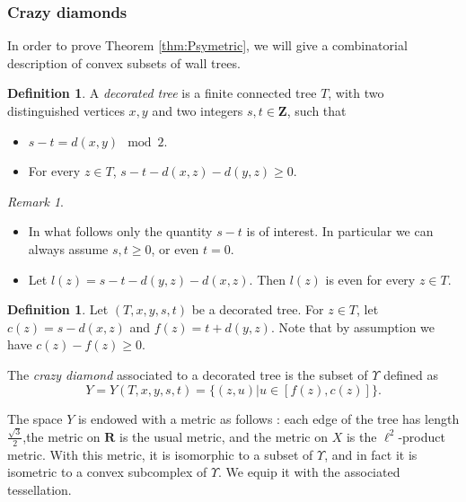 \documentclass[a4paper, 11pt]{article}
\theoremstyle{plain}
\theoremstyle{definition}
\newtheorem{definition}[proposition]{Definition}
\theoremstyle{remark}
\newtheorem{remark}[proposition]{Remark}
\newcommand{\RR}{\mathbf{R}}                          %
\newcommand{\ZZ}{\mathbf{Z}}                          %
\begin{document}
\subsubsection{Crazy diamonds}\label{sec:crazydiamonds}

In order to prove Theorem \ref{thm:Psymetric}, we will give a combinatorial description of convex subsets of wall trees.

\begin{definition}%
A \emph{decorated tree} is a 
 finite connected tree $T$, with two distinguished vertices $x,y$ and two integers $s,t\in \ZZ$, such that
 \begin{itemize}
 \item $s-t=d(x,y) \mod 2$.
 \item For every $z\in T$, $s-t-d(x,z)-d(y,z)\geq 0$.
 \end{itemize}
\end{definition}

\begin{remark}
\begin{itemize}
\item In what follows only the quantity $s-t$ is of interest. In particular we can always assume $s,t\geq 0$, or even $t=0$.
\item Let $l(z)=s-t-d(y,z)-d(x,z)$. Then $l(z)$ is even for every $z\in T$.
\end{itemize}
\end{remark}



\begin{definition}
Let $(T,x,y,s,t)$ be a decorated tree. For $z\in T$, let $c(z)=s-d(x,z)$ and $f(z)=t+d(y,z)$. Note that by assumption we have $c(z)-f(z)\geq 0$. %

The \emph{crazy diamond} associated to a decorated tree is the subset of $\Upsilon$ defined as 
$$Y=Y(T,x,y,s,t)=\{ (z,u) | u \in [f(z),c(z)] \}.$$

The space $Y$ is endowed with a metric as follows : each edge of the tree has length $\frac{\sqrt 3}2$,the metric on $\RR$ is the usual metric, and the metric on $X$ is the $\ell^2$-product metric. With this metric, it is isomorphic to a subset of $\Upsilon$, and in fact it is isometric to a convex subcomplex of $\Upsilon$. We equip it with the associated tessellation.
\end{definition}
\end{document}
